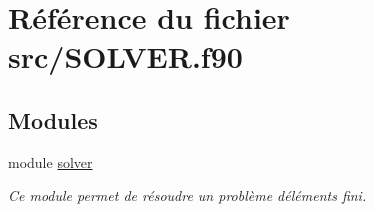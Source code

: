 \hypertarget{_s_o_l_v_e_r_8f90}{}\section{Référence du fichier src/\+S\+O\+L\+V\+ER.f90}
\label{_s_o_l_v_e_r_8f90}
\subsection*{Modules}
\begin{DoxyCompactItemize}
\item 
module \hyperlink{namespacesolver}{solver}
\begin{DoxyCompactList}\small\item\em Ce module permet de résoudre un problème d\textquotesingle{}éléments fini. \end{DoxyCompactList}\end{DoxyCompactItemize}
